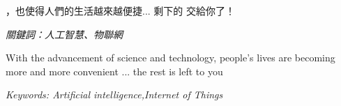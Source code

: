 \renewcommand{\abstractname}{摘要}
\begin{cntabstract}
，也使得人們的生活越來越便捷... 剩下的 交給你了！

\hbox{}
\it{關鍵詞：人工智慧、物聯網}
\end{cntabstract}

\addchaptertocentry{\abstractname}



\renewcommand{\abstractname}{Abstract}
\begin{engabstract}

With the advancement of science and technology, people's lives are becoming more and more convenient ... the rest is left to you

\hbox{}
\it{Keywords: Artificial intelligence,Internet of Things}
\end{engabstract}